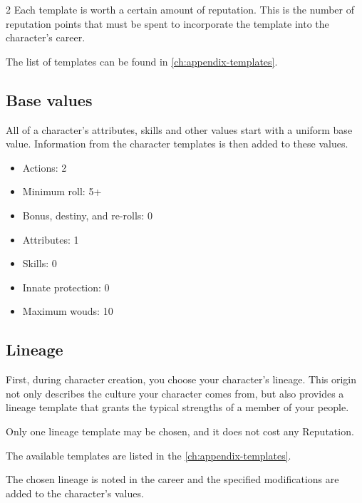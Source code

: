 \begin{multicols}{2}
Each template is worth a certain amount of reputation. This is the number of reputation points that must be spent to incorporate the template into the character's career.

The list of templates can be found in \cref{ch:appendix-templates}.

\subsection{Base values}

All of a character's attributes, skills and other values start with a uniform base value. Information from the character templates is then added to these values.

\begin{itemize}
    \item Actions: 2
    \item Minimum roll: 5+
    \item Bonus, destiny, and re-rolls: 0
    \item Attributes: 1
    \item Skills: 0
    \item Innate protection: 0
    \item Maximum wouds: 10
\end{itemize}

\subsection{Lineage}

First, during character creation, you choose your character’s lineage. This origin not only describes the culture your character comes from, but also provides a lineage template that grants the typical strengths of a member of your people.

Only one lineage template may be chosen, and it does not cost any Reputation.

The available templates are listed in the \cref{ch:appendix-templates}.

The chosen lineage is noted in the career and the specified modifications are added to the character's values.


\end{multicols}
